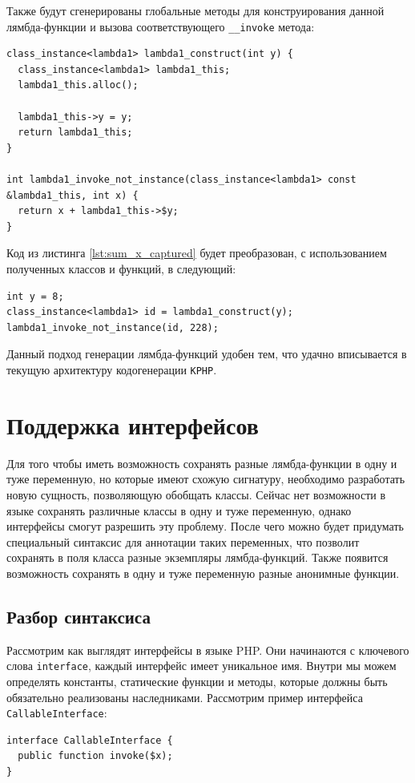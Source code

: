 Также будут сгенерированы глобальные методы для конструирования данной лямбда-функции и вызова соответствующего \verb|__invoke| метода:
\begin{lstlisting}
class_instance<lambda1> lambda1_construct(int y) {
  class_instance<lambda1> lambda1_this;
  lambda1_this.alloc();

  lambda1_this->y = y;
  return lambda1_this;
}

int lambda1_invoke_not_instance(class_instance<lambda1> const &lambda1_this, int x) {
  return x + lambda1_this->$y;
}
\end{lstlisting}

Код из листинга \ref{lst:sum_x_captured} будет преобразован, с использованием полученных классов и функций, в следующий:
\begin{lstlisting}
int y = 8;
class_instance<lambda1> id = lambda1_construct(y);
lambda1_invoke_not_instance(id, 228);
\end{lstlisting}

Данный подход генерации лямбда-функций удобен тем, что удачно вписывается в текущую архитектуру кодогенерации \verb|KPHP|.

\section{Поддержка интерфейсов}
Для того чтобы иметь возможность сохранять разные лямбда-функции в одну и туже переменную, но которые имеют схожую сигнатуру, необходимо разработать новую сущность, позволяющую обобщать классы.
Сейчас нет возможности в языке сохранять различные классы в одну и туже переменную, однако интерфейсы смогут разрешить эту проблему.
После чего можно будет придумать специальный синтаксис для аннотации таких переменных, что позволит сохранять в поля класса разные экземпляры лямбда-функций.
Также появится возможность сохранять в одну и туже переменную разные анонимные функции.

\subsection{Разбор синтаксиса}
Рассмотрим как выглядят интерфейсы в языке PHP.
Они начинаются с ключевого слова \verb|interface|, каждый интерфейс имеет уникальное имя.
Внутри мы можем определять константы, статические функции и методы, которые должны быть обязательно реализованы наследниками.
Рассмотрим пример интерфейса \verb|CallableInterface|:
\begin{lstlisting}[caption={Пример интерфейса Callable},label={lst:callable-interface-example}]
interface CallableInterface {
  public function invoke($x);
}
\end{lstlisting}

